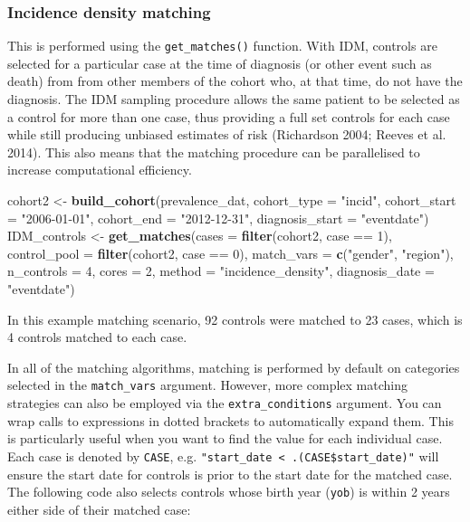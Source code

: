\documentclass[]{article}
\newenvironment{Shaded}{\begin{snugshade}}{\end{snugshade}}
\newcommand{\KeywordTok}[1]{\textcolor[rgb]{0.13,0.29,0.53}{\textbf{{#1}}}}
\newcommand{\DataTypeTok}[1]{\textcolor[rgb]{0.13,0.29,0.53}{{#1}}}
\newcommand{\DecValTok}[1]{\textcolor[rgb]{0.00,0.00,0.81}{{#1}}}
\newcommand{\StringTok}[1]{\textcolor[rgb]{0.31,0.60,0.02}{{#1}}}
\newcommand{\NormalTok}[1]{{#1}}
\begin{document}
\subsubsection{Incidence density
matching}\label{incidence-density-matching}

This is performed using the \texttt{get\_matches()} function. With IDM,
controls are selected for a particular case at the time of diagnosis (or
other event such as death) from from other members of the cohort who, at
that time, do not have the diagnosis. The IDM sampling procedure allows
the same patient to be selected as a control for more than one case,
thus providing a full set controls for each case while still producing
unbiased estimates of risk (Richardson 2004; Reeves et al. 2014). This
also means that the matching procedure can be parallelised to increase
computational efficiency.

\begin{Shaded}
\begin{Highlighting}[]
\NormalTok{cohort2 <-}\StringTok{ }\KeywordTok{build_cohort}\NormalTok{(prevalence_dat, }\DataTypeTok{cohort_type =} \StringTok{"incid"}\NormalTok{, }
                        \DataTypeTok{cohort_start =} \StringTok{"2006-01-01"}\NormalTok{, }\DataTypeTok{cohort_end =} \StringTok{"2012-12-31"}\NormalTok{, }
                        \DataTypeTok{diagnosis_start =} \StringTok{"eventdate"}\NormalTok{)}
\NormalTok{IDM_controls <-}\StringTok{ }\KeywordTok{get_matches}\NormalTok{(}\DataTypeTok{cases =} \KeywordTok{filter}\NormalTok{(cohort2, case ==}\StringTok{ }\DecValTok{1}\NormalTok{), }
                            \DataTypeTok{control_pool =} \KeywordTok{filter}\NormalTok{(cohort2, case ==}\StringTok{ }\DecValTok{0}\NormalTok{), }
                            \DataTypeTok{match_vars =} \KeywordTok{c}\NormalTok{(}\StringTok{"gender"}\NormalTok{, }\StringTok{"region"}\NormalTok{),}
                            \DataTypeTok{n_controls =} \DecValTok{4}\NormalTok{, }\DataTypeTok{cores =} \DecValTok{2}\NormalTok{, }
                            \DataTypeTok{method =} \StringTok{"incidence_density"}\NormalTok{, }\DataTypeTok{diagnosis_date  =} \StringTok{"eventdate"}\NormalTok{)}
\end{Highlighting}
\end{Shaded}

In this example matching scenario, 92 controls were matched to 23 cases,
which is 4 controls matched to each case.

In all of the matching algorithms, matching is performed by default on
categories selected in the \texttt{match\_vars} argument. However, more
complex matching strategies can also be employed via the
\texttt{extra\_conditions} argument. You can wrap calls to expressions
in dotted brackets to automatically expand them. This is particularly
useful when you want to find the value for each individual case. Each
case is denoted by \texttt{CASE}, e.g.
\texttt{"start\_date \textless{} .(CASE\$start\_date)"} will ensure the
start date for controls is prior to the start date for the matched case.
The following code also selects controls whose birth year (\texttt{yob})
is within 2 years either side of their matched case:
\end{document}
